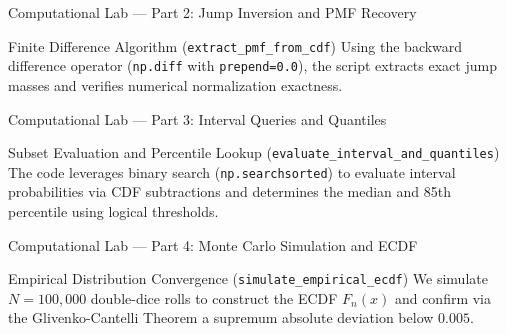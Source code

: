 \documentclass[aspectratio=169,xcolor={dvipsnames,table}]{beamer}
\begin{document}
\begin{frame}[fragile]{Computational Lab --- Part 2: Jump Inversion and PMF Recovery}
	\begin{block}{Finite Difference Algorithm (\texttt{extract\_pmf\_from\_cdf})}
		\scriptsize
		Using the backward difference operator (\texttt{np.diff} with \texttt{prepend=0.0}), the script extracts exact jump masses and verifies numerical normalization exactness.
	\end{block}
	\vspace{-0.1cm}
	
\end{frame}

\begin{frame}[fragile]{Computational Lab --- Part 3: Interval Queries and Quantiles}
	\begin{block}{Subset Evaluation and Percentile Lookup (\texttt{evaluate\_interval\_and\_quantiles})}
		\scriptsize
		The code leverages binary search (\texttt{np.searchsorted}) to evaluate interval probabilities via CDF subtractions and determines the median and 85th percentile using logical thresholds.
	\end{block}
	\vspace{-0.1cm}
	
\end{frame}

\begin{frame}[fragile]{Computational Lab --- Part 4: Monte Carlo Simulation and ECDF}
	\begin{block}{Empirical Distribution Convergence (\texttt{simulate\_empirical\_ecdf})}
		\scriptsize
		We simulate $N=100,000$ double-dice rolls to construct the ECDF $F_n(x)$ and confirm via the Glivenko-Cantelli Theorem a supremum absolute deviation below $0.005$.
	\end{block}
	\vspace{-0.2cm}
	
\end{frame}
\end{document}
